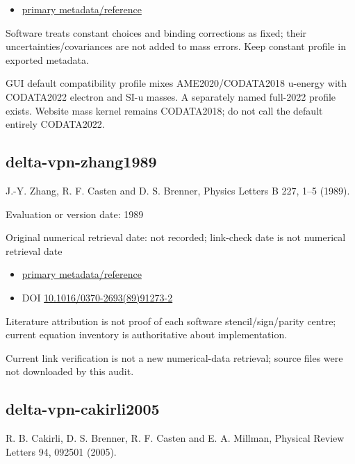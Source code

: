 \documentclass[
  11pt,
  letterpaper,
]{article}
\providecommand{\tightlist}{%
  \setlength{\itemsep}{0pt}\setlength{\parskip}{0pt}}
\begin{document}
\begin{itemize}
\tightlist
\item
  \href{https://physics.nist.gov/cuu/Constants/Table/allascii.txt}{primary
  metadata/reference}
\end{itemize}

Software treats constant choices and binding corrections as fixed; their
uncertainties/covariances are not added to mass errors. Keep constant
profile in exported metadata.

GUI default compatibility profile mixes AME2020/CODATA2018 u-energy with
CODATA2022 electron and SI-u masses. A separately named full-2022
profile exists. Website mass kernel remains CODATA2018; do not call the
default entirely CODATA2022.

\subsection{delta-vpn-zhang1989}\label{delta-vpn-zhang1989}

J.-Y. Zhang, R. F. Casten and D. S. Brenner, Physics Letters B 227, 1--5
(1989).

Evaluation or version date: 1989

Original numerical retrieval date: not recorded; link-check date is not
numerical retrieval date

\begin{itemize}
\tightlist
\item
  \href{https://www.sciencedirect.com/science/article/pii/0370269389912732/pdf}{primary
  metadata/reference}
\item
  DOI
  \href{https://doi.org/10.1016/0370-2693(89)91273-2}{10.1016/0370-2693(89)91273-2}
\end{itemize}

Literature attribution is not proof of each software stencil/sign/parity
centre; current equation inventory is authoritative about
implementation.

Current link verification is not a new numerical-data retrieval; source
files were not downloaded by this audit.

\subsection{delta-vpn-cakirli2005}\label{delta-vpn-cakirli2005}

R. B. Cakirli, D. S. Brenner, R. F. Casten and E. A. Millman, Physical
Review Letters 94, 092501 (2005).
\end{document}
